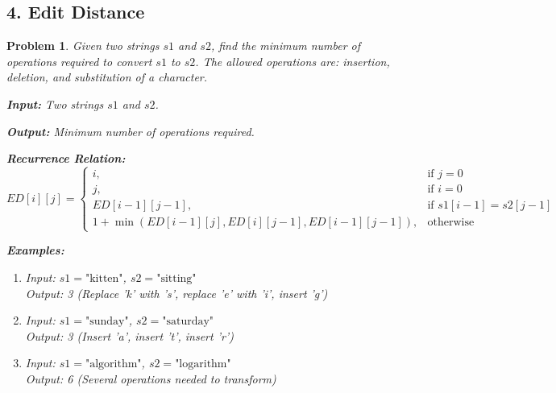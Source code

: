 \documentclass{article}
\newtheorem{problem}{Problem}
\begin{document}
\subsection*{4. Edit Distance}
\begin{problem}
Given two strings $s1$ and $s2$, find the minimum number of operations required to convert $s1$ to $s2$. The allowed operations are: insertion, deletion, and substitution of a character.

\textbf{Input:} Two strings $s1$ and $s2$.

\textbf{Output:} Minimum number of operations required.

\textbf{Recurrence Relation:}
\[
ED[i][j] = 
\begin{cases}
i, & \text{if } j = 0 \\
j, & \text{if } i = 0 \\
ED[i-1][j-1], & \text{if } s1[i-1] = s2[j-1] \\
1 + \min(ED[i-1][j], ED[i][j-1], ED[i-1][j-1]), & \text{otherwise}
\end{cases}
\]

\textbf{Examples:}
\begin{enumerate}
\item Input: $s1 = \text{"kitten"}$, $s2 = \text{"sitting"}$ \\
      Output: 3 (Replace 'k' with 's', replace 'e' with 'i', insert 'g')
\item Input: $s1 = \text{"sunday"}$, $s2 = \text{"saturday"}$ \\
      Output: 3 (Insert 'a', insert 't', insert 'r')
\item Input: $s1 = \text{"algorithm"}$, $s2 = \text{"logarithm"}$ \\
      Output: 6 (Several operations needed to transform)
\end{enumerate}
\end{problem}

\end{document}
